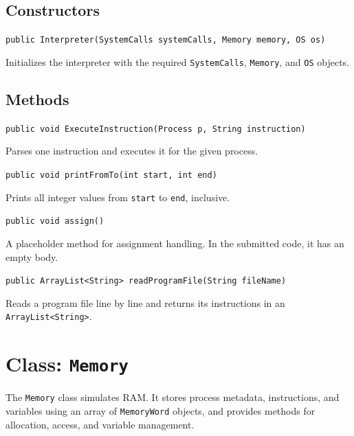 \documentclass[12pt,a4paper]{article}
\begin{document}
\subsection{Constructors}

\begin{signaturebox}
\texttt{public Interpreter(SystemCalls systemCalls, Memory memory, OS os)}
\end{signaturebox}

Initializes the interpreter with the required \texttt{SystemCalls}, \texttt{Memory}, and \texttt{OS} objects.

\subsection{Methods}

\begin{signaturebox}
\texttt{public void ExecuteInstruction(Process p, String instruction)}
\end{signaturebox}
Parses one instruction and executes it for the given process.

\begin{signaturebox}
\texttt{public void printFromTo(int start, int end)}
\end{signaturebox}
Prints all integer values from \texttt{start} to \texttt{end}, inclusive.

\begin{signaturebox}
\texttt{public void assign()}
\end{signaturebox}
A placeholder method for assignment handling. In the submitted code, it has an empty body.

\begin{signaturebox}
\texttt{public ArrayList<String> readProgramFile(String fileName)}
\end{signaturebox}
Reads a program file line by line and returns its instructions in an \texttt{ArrayList<String>}.

\section{Class: \texttt{Memory}}

\begin{purposebox}
The \texttt{Memory} class simulates RAM. It stores process metadata, instructions, and variables using an array of \texttt{MemoryWord} objects, and provides methods for allocation, access, and variable management.
\end{purposebox}
\end{document}
